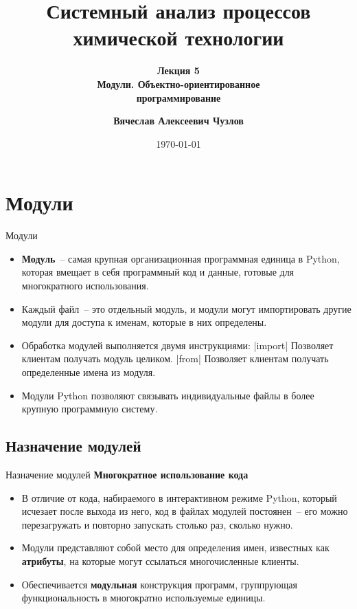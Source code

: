 \documentclass[aspectratio=169, mathserif]{beamer}	%
\title{\LARGE{Системный анализ процессов химической технологии}}
\subtitle{\textcolor{tpugreen}{\textbf{Лекция 5}} \\ \textbf{Модули. Объектно-ориентированное \\ программирование}}
\author[]{\textbf{Вячеслав Алексеевич Чузлов}}
\institute{к.т.н., доцент ОХИ ИШПР}
\date{\today}
\begin{document}

\titleframe		%

\tocframe{}		%


\section{Модули}
\sectionframe

\begin{frame}[fragile]{Модули}
\scriptsize
\begin{itemize}
	\item \textcolor{extraorange}{\textbf{Модуль}}~-- самая крупная организационная программная единица в Python, которая вмещает в себя программный код и данные, готовые для многократного использования.
	\item Каждый файл~-- это отдельный модуль, и модули могут импортировать другие модули для доступа к именам, которые в них определены.
	\item Обработка модулей выполняется двумя инструкциями:
	\vfill
	|import|
	\qquad Позволяет клиентам получать модуль целиком.
	\vfill
	|from|
	\qquad Позволяет клиентам получать определенные имена из модуля.
	\vfill
	\item Модули Python позволяют связывать индивидуальные файлы в более крупную программную систему.
\end{itemize}
\vfill
\end{frame}

\subsection{Назначение модулей}

\begin{frame}[fragile]{Назначение модулей}
\scriptsize
\textcolor{tpugreen}{\textbf{Многократное использование кода}}
\vfill
\begin{itemize}
	\item В отличие от кода, набираемого в интерактивном режиме Python, который исчезает после выхода из него, код в файлах модулей постоянен~-- его можно перезагружать и повторно запускать столько раз, сколько нужно.
	\vfill
	\item Модули представляют собой место для определения имен, известных как \textcolor{extraorange}{\textbf{атрибуты}}, на которые могут ссылаться многочисленные клиенты.
	\vfill
	\item Обеспечивается \textcolor{extraorange}{\textbf{модульная}} конструкция программ, группрующая функциональность в многократно используемые единицы.
\end{itemize}
\vfill
\end{frame}
\end{document}
